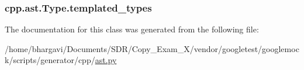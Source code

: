 \subsubsection[{\texorpdfstring{templated\+\_\+types}{templated_types}}]{\setlength{\rightskip}{0pt plus 5cm}cpp.\+ast.\+Type.\+templated\+\_\+types}\hypertarget{classcpp_1_1ast_1_1_type_a7c38fcafa00dae6ee22bab783086a1a7}{}\label{classcpp_1_1ast_1_1_type_a7c38fcafa00dae6ee22bab783086a1a7}


The documentation for this class was generated from the following file\+:\begin{DoxyCompactItemize}
\item 
/home/bhargavi/\+Documents/\+S\+D\+R/\+Copy\+\_\+\+Exam\+\_\+X/vendor/googletest/googlemock/scripts/generator/cpp/\hyperlink{ast_8py}{ast.\+py}\end{DoxyCompactItemize}
